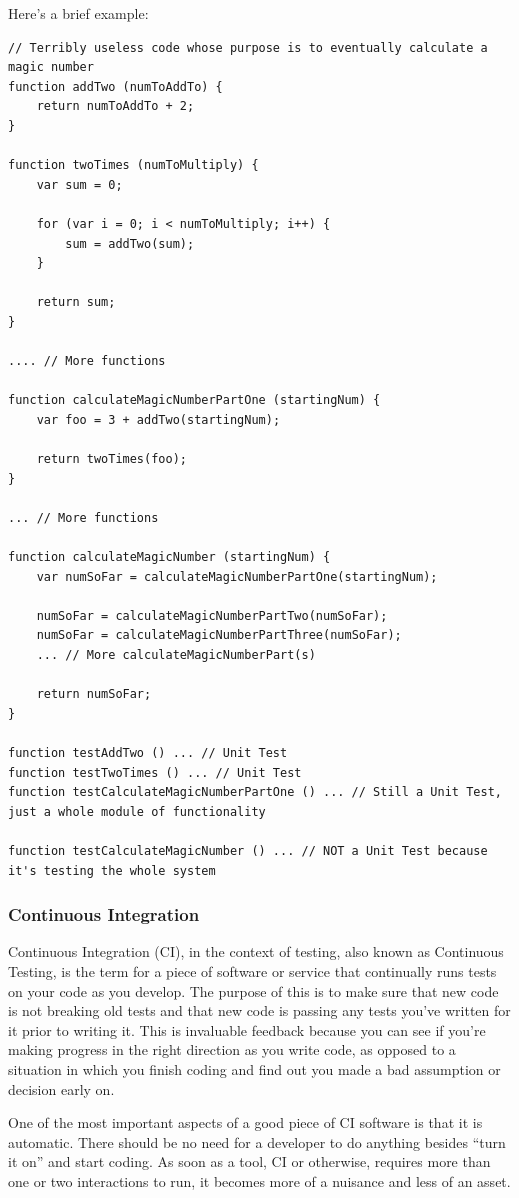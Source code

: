 \documentclass[11pt]{article}
\begin{document}
Here's a brief example:
\begin{lstlisting}
// Terribly useless code whose purpose is to eventually calculate a magic number
function addTwo (numToAddTo) {
	return numToAddTo + 2;
}

function twoTimes (numToMultiply) {
	var sum = 0;

	for (var i = 0; i < numToMultiply; i++) {
		sum = addTwo(sum);
	}

	return sum;
}

.... // More functions

function calculateMagicNumberPartOne (startingNum) {
	var foo = 3 + addTwo(startingNum);

	return twoTimes(foo);
}

... // More functions

function calculateMagicNumber (startingNum) {
	var numSoFar = calculateMagicNumberPartOne(startingNum);

	numSoFar = calculateMagicNumberPartTwo(numSoFar);
	numSoFar = calculateMagicNumberPartThree(numSoFar);
	... // More calculateMagicNumberPart(s)

	return numSoFar;
}

function testAddTwo () ... // Unit Test
function testTwoTimes () ... // Unit Test
function testCalculateMagicNumberPartOne () ... // Still a Unit Test, just a whole module of functionality

function testCalculateMagicNumber () ... // NOT a Unit Test because it's testing the whole system
\end{lstlisting}

\subsubsection{Continuous Integration}
Continuous Integration (CI), in the context of testing, also known as Continuous Testing, is the term for a piece of software or service that continually runs tests on your code as you develop. The purpose of this is to make sure that new code is not breaking old tests and that new code is passing any tests you've written for it prior to writing it. This is invaluable feedback because you can see if you're making progress in the right direction as you write code, as opposed to a situation in which you finish coding and find out you made a bad assumption or decision early on. 

One of the most important aspects of a good piece of CI software is that it is automatic. There should be no need for a developer to do anything besides ``turn it on'' and start coding. As soon as a tool, CI or otherwise, requires more than one or two interactions to run, it becomes more of a nuisance and less of an asset.
\end{document}
